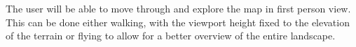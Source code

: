 The user will be able to move through and explore the map in first person view. This can be done either walking, with the viewport height fixed to the elevation of the terrain or flying to allow for a better overview of the entire landscape.


